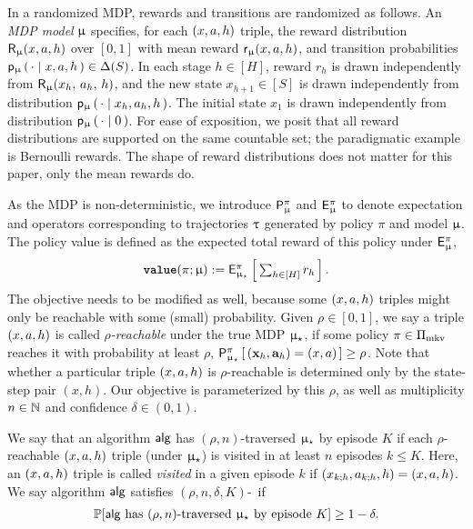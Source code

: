 
In a randomized MDP, rewards and transitions are randomized as follows. An \emph{MDP model} $\upmu$ specifies, for each $(x,a,h)$ triple,
the reward distribution
    $\mathsf{R}_{\upmu}(x,a,h)$
over $[0,1]$ with mean reward
    $\mathsf{r}_{\upmu}(x,a,h)$,
and transition probabilities
    $\mathsf{p}_{\upmu}\left(\,\cdot \mid x,a,h\,\right) \in \Delta(S)$.
In each stage $h\in[H]$, reward $r_h$ is drawn independently from
    $\mathsf{R}_{\upmu}(x_h,\, a_h,\, h)$,
and the new state $x_{h+1}\in[S]$ is drawn independently from distribution
    $\mathsf{p}_{\upmu}\left(\,\cdot \mid x_h,a_h,h\,\right)$.
The initial state $x_1$ is drawn independently from distribution
    $\mathsf{p}_{\upmu}\left(\,\cdot \mid 0\,\right)$.
For ease of exposition, we posit that all reward distributions are supported on the same countable set; the paradigmatic example is Bernoulli rewards. The shape of reward distributions does not matter for this paper, only the mean rewards do.

As the MDP is non-deterministic, we introduce $\mathsf{P}_{\upmu}^{\pi}$ and $\mathsf{E}^{\pi}_{\upmu}$ to denote expectation and operators corresponding to trajectories ${\uptau}$ generated by policy $\pi$ and model $\upmu$. The policy value is defined as the expected total reward of this policy under $\mathsf{E}^{\pi}_{\upmu}$,
\begin{align*}
{\normalfont \texttt{\textbf{value}}}(\pi;\upmu) := \textstyle \mathsf{E}_{\upmu_{\star}}^{\pi}\left[\,\sum_{h\in[H]} r_h\,\right].
\end{align*}
The \traversal objective needs to be modified as well, because some $(x,a,h)$ triples might only be reachable with some (small) probability. Given $\rho\in [0,1]$, we say a triple $(x,a,h)$ is called \emph{$\rho$-reachable} under the true MDP $\upmu_{\star}$,  if some policy $\pi \in \Pi_{\mathrm{mkv}}$ reaches it with probability at least $\rho$, \ie
    $\mathsf{P}_{\upmu_{\star}}^{\pi}\left[\, (\mathbf{x}_h,\mathbf{a}_h) = (x,a)\,\right] \ge \rho$.
Note that whether a particular triple $(x,a,h)$ is $\rho$-reachable is determined only by the state-step pair $(x,h)$.
Our objective is parameterized by this $\rho$, as well as multiplicity $n\in\mathbb{N}$ and confidence $\delta\in(0,1)$.

\begin{definition}
We say that an algorithm $\mathsf{alg}$  has $(\rho,n)$-traversed $\upmu_{\star}$ by episode $K$ if each $\rho$-reachable $(x,a,h)$ triple (under $\upmu_{\star}$) is visited in at least $n$ episodes $k \le K$. Here, an $(x,a,h)$ triple is called \emph{visited} in a given episode $k$ if $ (x_{k;h},a_{k;h},h) = (x,a,h)$. We say algorithm $\mathsf{alg}$ satisfies $(\rho,n,\delta,K)$-\traversal \ if
\begin{align}
\operatorname{\mathbb{P}}[\mathsf{alg} \text{ has $(\rho,n)$-traversed } \upmu_{\star} \text{ by episode } K] \ge 1 -\delta.
\end{align}
\end{definition}

